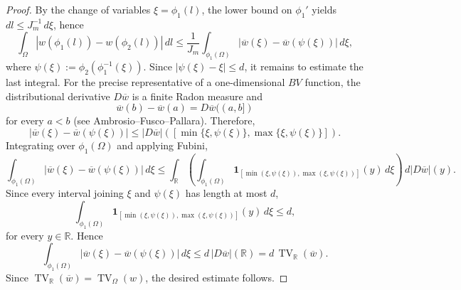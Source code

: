 \documentclass[10pt,a4paper]{amsart}
\begin{document}
\begin{proof}
By the change of variables
\(\xi=\phi_1(l)\),
the lower bound on \(\phi_1'\) yields
$dl \le J_m^{-1}\,d\xi$,
hence
\[
\int_\Omega
|w(\phi_1(l))-w(\phi_2(l))|
\,dl
\le
\frac1{J_m}
\int_{\phi_1(\Omega)}
|\overline w(\xi)-\overline w(\psi(\xi))|
\,d\xi,
\]
where $\psi(\xi) := \phi_2(\phi_1^{-1}(\xi))$.
Since $|\psi(\xi)-\xi| \le d$,
it remains to estimate the last integral.
For the precise representative of a one-dimensional
\(BV\) function,
the distributional derivative
\(D\overline w\)
is a finite Radon measure and
\[
\overline w(b)-\overline w(a)
=
D\overline w((a,b])
\]
for every \(a<b\)
(see Ambrosio--Fusco--Pallara).
Therefore,
\[
|\overline w(\xi)-\overline w(\psi(\xi))|
\le
|D\overline w|
\!\left(
[\min\{\xi,\psi(\xi)\},
\max\{\xi,\psi(\xi)\}]
\right).
\]
Integrating over \(\phi_1(\Omega)\) and applying Fubini,
\[
\int_{\phi_1(\Omega)}
|\overline w(\xi)-\overline w(\psi(\xi))|
\,d\xi \le
\int_{\mathbb R}
\left(
\int_{\phi_1(\Omega)}
\mathbf 1_{
[\min(\xi,\psi(\xi)),
\max(\xi,\psi(\xi))]
}(y)
\,d\xi
\right)
\,d|D\overline w|(y).
\]
Since every interval
joining
\(\xi\)
and
\(\psi(\xi)\)
has length at most \(d\),
\[
\int_{\phi_1(\Omega)}
\mathbf 1_{
[\min(\xi,\psi(\xi)),
\max(\xi,\psi(\xi))]
}(y)
\,d\xi
\le
d,
\]
for every \(y\in\mathbb R\).
Hence
\[
\int_{\phi_1(\Omega)}
|\overline w(\xi)-\overline w(\psi(\xi))|
\,d\xi
\le
d\,|D\overline w|(\mathbb R)
=
d\,\operatorname{TV}_{\mathbb R}(\overline w).
\]
Since $\operatorname{TV}_{\mathbb R}(\overline w)
=
\operatorname{TV}_\Omega(w)$, the desired estimate follows.
\end{proof}
\end{document}
